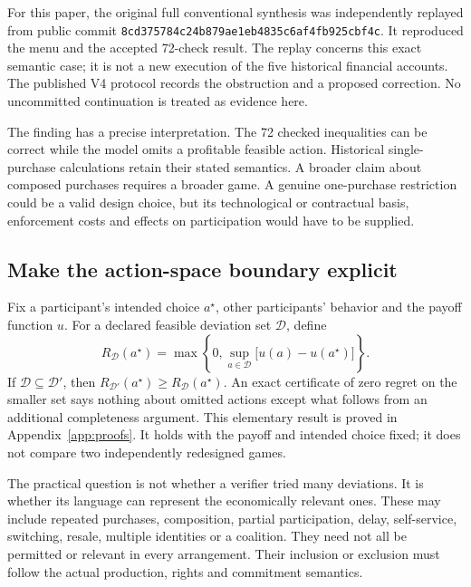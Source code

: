 For this paper, the original full conventional synthesis was independently replayed from public commit \nolinkurl{8cd375784c24b879ae1eb4835c6af4fb925cbf4c}. It reproduced the menu and the accepted 72-check result. The replay concerns this exact semantic case; it is not a new execution of the five historical financial accounts. The published V4 protocol records the obstruction and a proposed correction. No uncommitted continuation is treated as evidence here.

The finding has a precise interpretation. The 72 checked inequalities can be correct while the model omits a profitable feasible action. Historical single-purchase calculations retain their stated semantics. A broader claim about composed purchases requires a broader game. A genuine one-purchase restriction could be a valid design choice, but its technological or contractual basis, enforcement costs and effects on participation would have to be supplied.


\subsection{Make the action-space boundary explicit}
Fix a participant's intended choice $a^\star$, other participants' behavior and the payoff function $u$. For a declared feasible deviation set $\mathcal D$, define
\begin{equation}
R_{\mathcal D}(a^\star)=\max\left\{0,\sup_{a\in\mathcal D}\bigl[u(a)-u(a^\star)\bigr]\right\}.
\label{eq:regret}
\end{equation}
If $\mathcal D\subseteq\mathcal D'$, then $R_{\mathcal D'}(a^\star)\ge R_{\mathcal D}(a^\star)$. An exact certificate of zero regret on the smaller set says nothing about omitted actions except what follows from an additional completeness argument. This elementary result is proved in Appendix~\ref{app:proofs}. It holds with the payoff and intended choice fixed; it does not compare two independently redesigned games.

The practical question is not whether a verifier tried many deviations. It is whether its language can represent the economically relevant ones. These may include repeated purchases, composition, partial participation, delay, self-service, switching, resale, multiple identities or a coalition. They need not all be permitted or relevant in every arrangement. Their inclusion or exclusion must follow the actual production, rights and commitment semantics.

